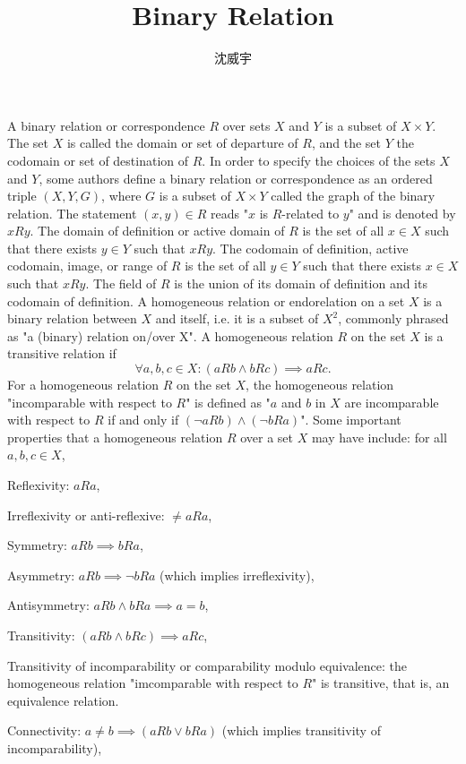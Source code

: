 \documentclass[a4paper,12pt]{article}
\begin{document}
\title{Binary Relation}
\author{沈威宇}
\date{\temtoday}
\titletocdoc
{}
A binary relation or correspondence $R$ over sets $X$ and $Y$ is a subset of $X\times Y$. The set $X$ is called the domain or set of departure of $R$, and the set $Y$ the codomain or set of destination of $R$. In order to specify the choices of the sets $X$ and $Y$, some authors define a binary relation or correspondence as an ordered triple $(X,Y,G)$, where $G$ is a subset of $X\times Y$ called the graph of the binary relation. The statement $(x,y)\in R$ reads "$x$ is $R$-related to $y$" and is denoted by $xRy$. The domain of definition or active domain of $R$ is the set of all $x\in X$ such that there exists $y\in Y$ such that $xRy$. The codomain of definition, active codomain, image, or range of $R$ is the set of all $y\in Y$ such that there exists $x\in X$ such that $xRy$. The field of $R$ is the union of its domain of definition and its codomain of definition.
A homogeneous relation or endorelation on a set $X$ is a binary relation between $X$ and itself, i.e. it is a subset of $X^2$, commonly phrased as "a (binary) relation on/over X".
A homogeneous relation $R$ on the set $X$ is a transitive relation if
\[\forall a, b, c \in X\colon (aRb\land bRc)\implies aRc.\]
For a homogeneous relation $R$ on the set $X$, the homogeneous relation "incomparable with respect to $R$" is defined as "$a$ and $b$ in $X$ are incomparable with respect to $R$ if and only if $(\neg aRb)\land (\neg bRa)$".
Some important properties that a homogeneous relation $R$ over a set $X$ may have include: for all $a,b,c\in X$,
\bit
\item Reflexivity: $aRa$,
\item Irreflexivity or anti-reflexive: $\neq aRa$,
\item Symmetry: $aRb\implies bRa$,
\item Asymmetry: $aRb\implies \neg bRa$ (which implies irreflexivity),
\item Antisymmetry: $aRb\land bRa\implies a=b$,
\item Transitivity: $(aRb\land bRc)\implies aRc$,
\item Transitivity of incomparability or comparability modulo equivalence: the homogeneous relation "imcomparable with respect to $R$" is transitive, that is, an equivalence relation.
\item Connectivity: $a\neq b\implies (aRb\lor bRa)$ (which implies transitivity of incomparability),
\end{document}
